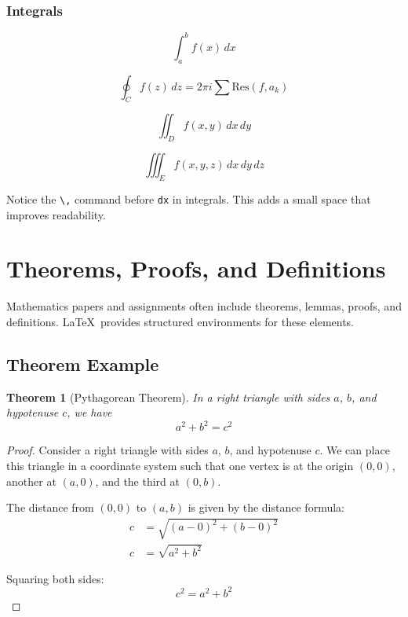 \documentclass[11pt,a4paper]{article}
\newtheorem{theorem}{Theorem}[section]
\begin{document}
\subsubsection{Integrals}
\begin{equation}
    \int_{a}^{b} f(x) \, dx
\end{equation}

\begin{equation}
    \oint_C f(z) \, dz = 2\pi i \sum \text{Res}(f, a_k)
\end{equation}

\begin{equation}
    \iint_D f(x,y) \, dx \, dy
\end{equation}

\begin{equation}
    \iiint_E f(x,y,z) \, dx \, dy \, dz
\end{equation}

\begin{tipbox}
Notice the \verb|\,| command before \verb|dx| in integrals. This adds a small space that improves readability.
\end{tipbox}

\section{Theorems, Proofs, and Definitions}

Mathematics papers and assignments often include theorems, lemmas, proofs, and definitions. \LaTeX\ provides structured environments for these elements.

\subsection{Theorem Example}

\begin{theorem}[Pythagorean Theorem]
    In a right triangle with sides $a$, $b$, and hypotenuse $c$, we have
    \begin{equation}
        a^2 + b^2 = c^2
    \end{equation}
\end{theorem}

\begin{proof}
    Consider a right triangle with sides $a$, $b$, and hypotenuse $c$. We can place this triangle in a coordinate system such that one vertex is at the origin $(0,0)$, another at $(a,0)$, and the third at $(0,b)$.
    
    The distance from $(0,0)$ to $(a,b)$ is given by the distance formula:
    \begin{align}
        c &= \sqrt{(a-0)^2 + (b-0)^2} \\
        c &= \sqrt{a^2 + b^2}
    \end{align}
    
    Squaring both sides:
    \begin{equation}
        c^2 = a^2 + b^2
    \end{equation}
\end{proof}
\end{document}
